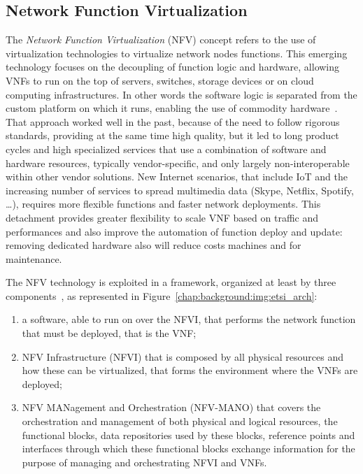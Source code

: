 \subsection{Network Function Virtualization}
The \emph{Network Function Virtualization} (NFV) concept refers to the use of
virtualization technologies to virtualize network nodes functions. This emerging
technology focuses on the decoupling of function logic and hardware, allowing
VNFs to run on the top of servers, switches, storage devices or on cloud
computing infrastructures. In other words the software logic is separated from
the custom platform on which it runs, enabling the use of commodity
hardware~\cite{gray2016network}. That approach worked well in the past, because
of the need to follow rigorous standards, providing at the same time high
quality, but it led to long product cycles and high specialized services that
use a combination of software and hardware resources, typically vendor-specific,
and only largely non-interoperable within other vendor solutions. New Internet
scenarios, that include IoT and the increasing number of services to spread
multimedia data (Skype, Netflix, Spotify, \dots), requires more flexible
functions and faster network deployments. This detachment provides greater
flexibility to scale VNF based on traffic and performances and also improve the
automation of function deploy and update: removing dedicated hardware also will
reduce costs machines and for maintenance.

The NFV technology is exploited in a framework, organized
at least by three components~\cite{etsi2013gs}, as represented in
Figure~\ref{chap:background:img:etsi_arch}:
\begin{enumerate}
  \item a software, able to run on over the NFVI, that performs the network
  function that must be deployed, that is the VNF;
  \item NFV Infrastructure (NFVI) that is composed by all physical resources
  and how these can be virtualized, that forms the environment where the VNFs
  are deployed;
  \item NFV MANagement and Orchestration (NFV-MANO) that covers the
  orchestration and management of both physical and logical resources, the
  functional blocks, data repositories used by these blocks, reference points
  and interfaces through which these functional blocks exchange
  information for the purpose of managing and orchestrating NFVI and VNFs.
\end{enumerate}

